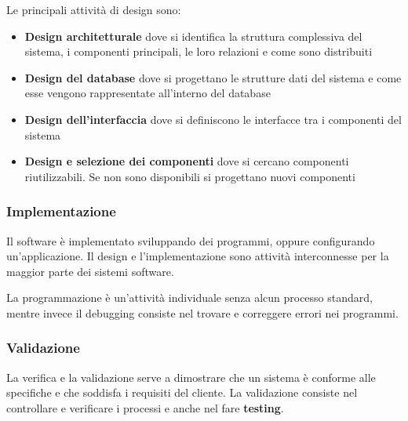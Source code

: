 \documentclass[a4paper]{article}
\begin{document}
\noindent
Le principali attività di design sono:
\begin{itemize}
  \item \textbf{Design architetturale} dove si identifica la struttura complessiva del
    sistema, i componenti principali, le loro relazioni e come sono distribuiti

  \item \textbf{Design del database} dove si progettano le strutture dati del sistema e
    come esse vengono rappresentate all'interno del database

  \item \textbf{Design dell'interfaccia} dove si definiscono le interfacce tra i 
    componenti del sistema

  \item \textbf{Design e selezione dei componenti} dove si cercano componenti 
    riutilizzabili. Se non sono disponibili si progettano nuovi componenti
\end{itemize}

\subsubsection{Implementazione}
Il software è implementato sviluppando dei programmi, oppure configurando un'applicazione.
Il design e l'implementazione sono attività interconnesse per la maggior parte dei sistemi
software.

La programmazione è un'attività individuale senza alcun processo standard,
mentre invece il debugging consiste nel trovare e correggere errori nei programmi.

\subsubsection{Validazione}
La verifica e la validazione serve a dimostrare che un sistema è conforme alle specifiche
e che soddisfa i requisiti del cliente. La validazione consiste nel controllare e
verificare i processi e anche nel fare \textbf{testing}.
\end{document}
